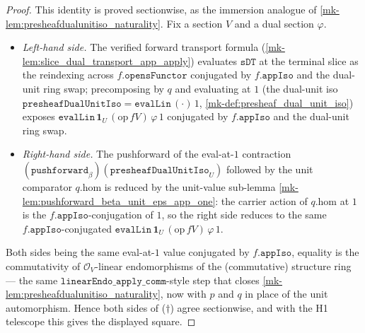 \begin{proof}
  This identity is proved sectionwise, as the immersion analogue of
  \ref{mk-lem:presheafdualunitiso_naturality}. Fix a section \(V\) and a dual section \(\varphi\).
  \begin{itemize}
    \item \emph{Left-hand side.} The verified forward transport formula
      (\ref{mk-lem:slice_dual_transport_app_apply}) evaluates \(\mathtt{sDT}\) at the terminal slice as
      the reindexing across \(f.\mathtt{opensFunctor}\) conjugated by \(f.\mathtt{appIso}\) and the
      dual-unit ring swap; precomposing by \(q\) and evaluating at \(1\) (the dual-unit iso
      \(\mathtt{presheafDualUnitIso} = \mathtt{evalLin}\,(\cdot)\,1\),
      \ref{mk-def:presheaf_dual_unit_iso}) exposes \(\mathtt{evalLin}\,\mathbf 1_U\,(\mathrm{op}\,fV)\,
      \varphi\,1\) conjugated by \(f.\mathtt{appIso}\) and the dual-unit ring swap.
    \item \emph{Right-hand side.} The pushforward of the eval-at-\(1\) contraction
      \((\mathtt{pushforward}_\beta)(\mathtt{presheafDualUnitIso}_U)\) followed by the unit comparator
      \(q.\mathrm{hom}\) is reduced by the unit-value sub-lemma
      \ref{mk-lem:pushforward_beta_unit_eps_app_one}: the carrier action of \(q.\mathrm{hom}\) at \(1\)
      is the \(f.\mathtt{appIso}\)-conjugation of \(1\), so the right side reduces to the same
      \(f.\mathtt{appIso}\)-conjugated \(\mathtt{evalLin}\,\mathbf 1_U\,(\mathrm{op}\,fV)\,\varphi\,1\).
  \end{itemize}
  Both sides being the same eval-at-\(1\) value conjugated by \(f.\mathtt{appIso}\), equality is the
  commutativity of \(\mathcal{O}_V\)-linear endomorphisms of the (commutative) structure ring --- the
  same \(\mathtt{linearEndo\_apply\_comm}\)-style step that closes
  \ref{mk-lem:presheafdualunitiso_naturality}, now with \(p\) and \(q\) in place of the unit
  automorphism. Hence both sides of ($\dagger$) agree sectionwise, and with the H1 telescope this gives the displayed
  square.
\end{proof}

